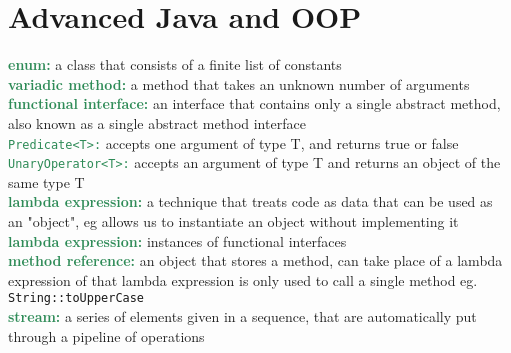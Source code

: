 \documentclass[a4paper,10pt]{article}
\begin{document}
\section{Advanced Java and OOP}
\textcolor{SeaGreen}{\textbf{enum:}} a class that consists of a finite list of constants \\ 
\textcolor{SeaGreen}{\textbf{variadic method:}} a method that takes an unknown number of arguments \\ 
\textcolor{SeaGreen}{\textbf{functional interface:}} an interface that contains only a single abstract method, also known as a single abstract method interface \\ 
\textcolor{SeaGreen}{\texttt{Predicate<T>:}} accepts one argument of type T, and returns true or false \\
\textcolor{SeaGreen}{\texttt{UnaryOperator<T>:}} accepts an argument of type T and returns an object of the same type T \\ 
\textcolor{SeaGreen}{\textbf{lambda expression:}} a technique that treats code as data that can be used as an "object", eg allows us to instantiate an object without implementing it \\
\textcolor{SeaGreen}{\textbf{lambda expression:}} instances of functional interfaces \\ 
\textcolor{SeaGreen}{\textbf{method reference:}} an object that stores a method, can take place of a lambda expression of that lambda expression is only used to call a single method eg. \texttt{String::toUpperCase}\\ 
\textcolor{SeaGreen}{\textbf{stream:}} a series of elements given in a sequence, that are automatically put through a pipeline of operations \\ 
\textcolor{SeaGreen}{\textbf{}}
\textcolor{SeaGreen}{\textbf{}}
\end{document}
